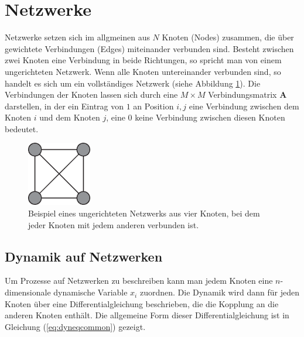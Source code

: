 
\section{Netzwerke}
Netzwerke setzen sich im allgmeinen aus $N$ Knoten (Nodes) zusammen, die über gewichtete Verbindungen (Edges) miteinander verbunden sind. Besteht zwischen zwei Knoten eine Verbindung in beide Richtungen, so spricht man von einem ungerichteten Netzwerk. Wenn alle Knoten untereinander verbunden sind, so handelt es sich um ein vollständiges Netzwerk (siehe Abbildung \ref{fig:GraphBsp}). Die Verbindungen der Knoten lassen sich durch eine $M\times M$ Verbindungsmatrix $\boldsymbol{A}$ darstellen, in der ein Eintrag von $1$ an Position $i,j$ eine Verbindung zwischen dem Knoten $i$ und dem Knoten $j$, eine $0$ keine Verbindung zwischen diesen Knoten bedeutet.

\begin{figure}[t]
	 \centering
	\includegraphics[width=0.25\textwidth]{abb/misc/GraphBsp.eps}
	\caption[Ungerichteres Netzwerk]{Beispiel eines ungerichteten Netzwerks aus vier Knoten, bei dem jeder Knoten mit jedem anderen verbunden ist.}
	\label{fig:GraphBsp}
\end{figure}


\subsection*{Dynamik auf Netzwerken}
Um Prozesse auf Netzwerken zu beschreiben kann man jedem Knoten eine $n$-dimensionale dynamische Variable $x_i$ zuordnen. Die Dynamik wird dann für jeden Knoten über eine Differentialgleichung beschrieben, die die Kopplung an die anderen Knoten enthält. Die allgemeine Form dieser Differentialgleichung ist in Gleichung (\ref*{eq:dyneqcommon}) gezeigt.


